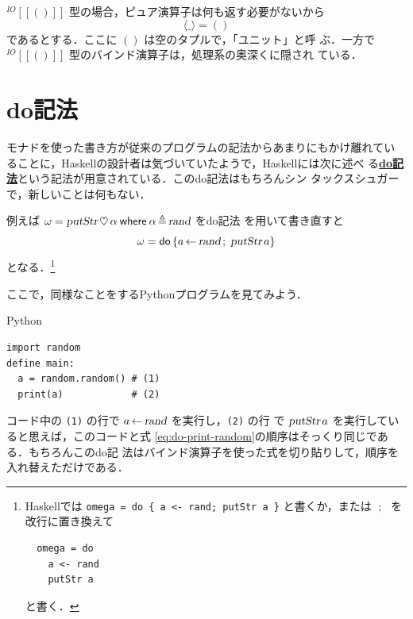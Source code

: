 \documentclass[a5paper,twoside,fleqn]{jsbook}
\def\[{\left[\!\left[}
\def\]{\right]\!\right]}
\newcommand{\programminglanguage}[1]{\textsf{#1}}
\newcommand{\haskell}{\programminglanguage{Haskell}}
\newcommand{\python}{\programminglanguage{Python}}
\newcommand{\keyword}[1]{{\underline{\textbf{#1}}}}
\newcommand{\code}[1]{\texttt{#1}}
\newenvironment{pythoncode}{\begin{itembox}[r]{\python}}{\end{itembox}}
\newcommand{\mKeyword}[1]{\mathsf{#1}} %
\newcommand{\mVarKeyword}[1]{\texttt{#1}} %
\newcommand{\mDoKeyword}{\mKeyword{do}}
\newcommand{\mDoLetKeyword}{\mVarKeyword{let}}
\newcommand{\mInKeyword}{\mKeyword{in}}
\newcommand{\mLetKeyword}{\mKeyword{let}}
\newcommand{\mWhereKeyword}{\mKeyword{where}}
\DeclareMathOperator{\mDoKW}{\mDoKeyword}
\DeclareMathOperator{\mInKW}{\mInKeyword} %
\DeclareMathOperator{\mLetKW}{\mLetKeyword} %
\newcommand{\mAnyParam}{\_}
\newcommand{\mAction}[1]{\textsl{#1}}
\DeclareMathOperator{\mPutStr}{\mAction{putStr}}
\DeclareMathOperator{\mRand}{\mAction{rand}}
\DeclareMathOperator{\mBind}{\heartsuit}
\DeclareMathOperator{\mDoEq}{\leftarrow}
\DeclareMathOperator{\mDoLetEq}{\mVarKeyword{=}}
\DeclareMathOperator{\mDoNext}{;\;}%
\DeclareMathOperator{\mLambda}{\backslash}
\DeclareMathOperator{\mLambdaArrow}{\rightarrow}
\DeclareMathOperator{\mLetEq}{\triangleq}
\newcommand{\mType}[1]{\mathbf{#1}}
\newcommand{\mUnitType}{\mType{()}}
\newcommand{\mGenericTypeAssemble}[2]{{}^{\mTypeConstructor{#1}}\[\mType{#2}\]}
\newcommand{\mIOType}[1]{\mGenericTypeAssemble{IO}{#1}}
\newcommand{\mIOUnitType}{\mIOType{\mUnitType}}
\newcommand{\mTypeConstructor}[1]{\textit{#1}}
\newcommand{\mPureWith}[1]{\langle#1\rangle}
\newcommand{\mTupleWith}[1]{\left(#1\right)}
\newcommand{\mDo}[1]{\mDoKW\left\{#1\right\}}
\newcommand{\mDoLet}[2]{\mathop{\mDoLetKeyword}#1\mDoLetEq#2}
\newcommand{\mLambdaExp}[2]{\mLambda{#1}\mLambdaArrow{#2}}
\newcommand{\mLetIn}[3]{\mLetKW#1\mLetEq#2\mInKW{#3}}
\newcommand{\mWhereIs}[2]{\mathbin{\mWhereKeyword}#1\mLetEq#2}
\begin{document}
$\mIOUnitType$ 型の場合，ピュア演算子は何も返す必要がないから
\begin{equation}
\mPureWith{\mAnyParam}=\mTupleWith{}
\end{equation}
であるとする．ここに $\mTupleWith{}$ は空のタプルで，「ユニット」と呼
ぶ．一方で $\mIOUnitType$ 型のバインド演算子は，処理系の奥深くに隠され
ている．




\section{do記法}


モナドを使った書き方が従来のプログラムの記法からあまりにもかけ離れてい
ることに，\haskell の設計者は気づいていたようで，\haskell には次に述べ
る\keyword{do記法}という記法が用意されている．このdo記法はもちろんシン
タックスシュガーで，新しいことは何もない．

例えば $\omega=\mPutStr\mBind\alpha\mWhereIs{\alpha}{\mRand}$ をdo記法
を用いて書き直すと
\begin{equation}
\label{eq:do-print-random}
\omega=\mDo{a\mDoEq\mRand\mDoNext\mPutStr a}
\end{equation}
となる．\footnote{\haskell では \code{omega = do \{ a <- rand; putStr
a \}} と書くか，または $\mDoNext$ を改行に置き換えて
\begin{verbatim}
  omega = do
    a <- rand
    putStr a
\end{verbatim}
と書く．}

ここで，同様なことをする\python プログラムを見てみよう．
\begin{pythoncode}
\begin{verbatim}
import random
define main:
  a = random.random() # (1)
  print(a)            # (2)
\end{verbatim}
\end{pythoncode}
コード中の \code{(1)} の行で $a\mDoEq\mRand$ を実行し，\code{(2)} の行
で $\mPutStr a$ を実行していると思えば，このコードと式
\eqref{eq:do-print-random}の順序はそっくり同じである．もちろんこのdo記
法はバインド演算子を使った式を切り貼りして，順序を入れ替えただけである．
\end{document}
